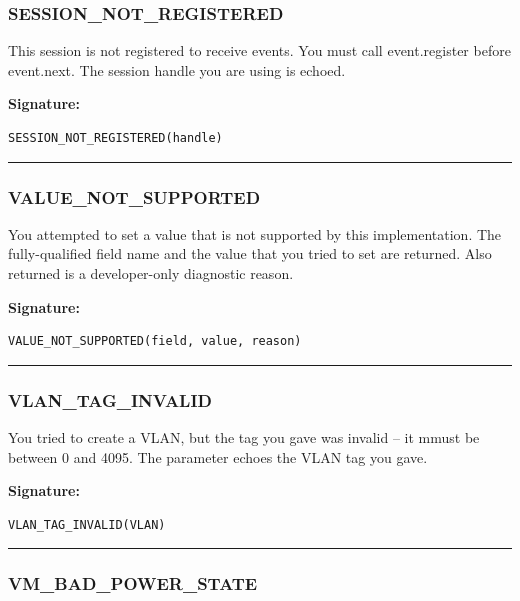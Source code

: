 \subsubsection{SESSION\_NOT\_REGISTERED}

This session is not registered to receive events.  You must call
event.register before event.next.  The session handle you are using is
echoed.

\vspace{0.3cm}
{\bf Signature:}
\begin{verbatim}SESSION_NOT_REGISTERED(handle)\end{verbatim}
\begin{center}\rule{10em}{0.1pt}\end{center}

\subsubsection{VALUE\_NOT\_SUPPORTED}

You attempted to set a value that is not supported by this implementation. 
The fully-qualified field name and the value that you tried to set are
returned.  Also returned is a developer-only diagnostic reason.

\vspace{0.3cm}
{\bf Signature:}
\begin{verbatim}VALUE_NOT_SUPPORTED(field, value, reason)\end{verbatim}
\begin{center}\rule{10em}{0.1pt}\end{center}

\subsubsection{VLAN\_TAG\_INVALID}

You tried to create a VLAN, but the tag you gave was invalid -- it mmust be
between 0 and 4095.  The parameter echoes the VLAN tag you gave.

\vspace{0.3cm}
{\bf Signature:}
\begin{verbatim}VLAN_TAG_INVALID(VLAN)\end{verbatim}
\begin{center}\rule{10em}{0.1pt}\end{center}

\subsubsection{VM\_BAD\_POWER\_STATE}


